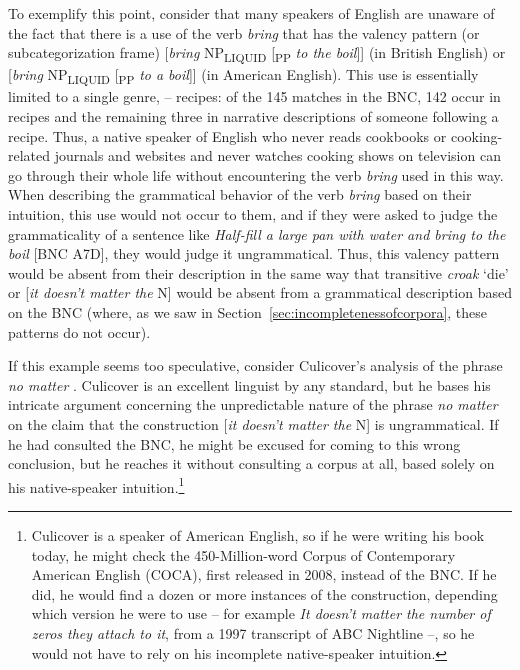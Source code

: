 To exemplify this point, consider that many speakers of English are unaware of the fact that there is a use of the verb  \textit{bring} that has the valency  pattern (or subcategorization frame) [\textit{bring} NP\textsubscript{LIQUID} [\textsubscript{PP} \textit{to the boil}]] (in British  English) or [\textit{bring} NP\textsubscript{LIQUID} [\textsubscript{PP} \textit{to a boil}]] (in American  English). This use is essentially limited to a single genre,  -- recipes: of the 145 matches in the BNC,  142 occur in recipes and the remaining three in narrative descriptions of someone following a recipe. Thus, a native speaker of English who never reads cookbooks or cooking\hyp{}related journals and websites and never watches cooking shows on television can go through their whole life without encountering the verb  \textit{bring} used in this way. When describing the grammatical behavior of the verb \textit{bring} based on their intuition,  this use would not occur to them, and if they were asked to judge the grammaticality  of a sentence like \textit{Half\hyp{}fill a large pan with water and bring to the boil} [BNC A7D], they would judge it ungrammatical.  Thus, this valency  pattern would be absent from their description  in the same way that transitive  \textit{croak} `die' or [\textit{it doesn't matter the} N] would be absent from a grammatical description based on the BNC  (where, as we saw in Section~\ref{sec:incompletenessofcorpora}, these patterns do not occur).

If this example seems too speculative, consider Culicover's analysis of the phrase \textit{no matter} \citep[106f.]{culicover_syntactic_1999}. Culicover is an excellent linguist by any standard, but he bases his intricate argument concerning the unpredictable nature of the phrase \textit{no matter} on the claim that the construction [\textit{it doesn't matter the} N] is ungrammatical.  If he had consulted the BNC,  he might be excused for coming to this wrong conclusion, but he reaches it without consulting a corpus at all, based solely on his native\hyp{}speaker  intuition.\footnote{Culicover is a speaker of American  English, so if he were writing his book today, he might check the 450\hyp{}Million\hyp{}word Corpus of Contemporary American English (COCA), first released in 2008, instead of the BNC.  If he did, he would find a dozen or more instances of the construction, depending which version he were to use -- for example \textit{It doesn't matter the number of zeros they attach to it}, from a 1997 transcript of ABC Nightline --, so he would not have to rely on his incomplete native\hyp{}speaker  intuition.}

